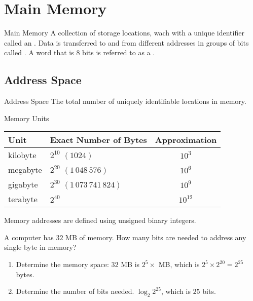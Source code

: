 \documentclass[\main/notes.tex]{subfiles}
\begin{document}
		\section{Main Memory}
			\begin{definition}{Main Memory}
				A collection of storage locations, wach with a unique identifier called an . Data is transferred to and from different addresses in groups of bits called . A word that is $8$ bits is referred to as a .
			\end{definition}
			\subsection{Address Space}
				\begin{definition}{Address Space}
					The total number of uniquely identifiable locations in memory.
				\end{definition}
				\begin{sidenote}{Memory Units}
					\begin{center}
						\begin{tabular}{llc}
							Unit & Exact Number of Bytes & Approximation\\
							\midrule
							kilobyte & $2^{10}$ $(1024)$ & $10^{3}$\\
							megabyte & $2^{20}$ $(1\,048\,576)$ & $10^{6}$\\
							gigabyte & $2^{30}$ $(1\,073\,741\,824)$ & $10^{9}$\\
							terabyte & $2^{40}$ & $10^{12}$
						\end{tabular}
					\end{center}
				\end{sidenote}
				Memory addresses are defined using unsigned binary integers.
				\begin{example}
					A computer has $32$ MB of memory. How many bits are needed to address any single byte in memory?
					\begin{enumerate}[nosep]
						\item Determine the memory space: $32$ MB is $2^{5} \times$ MB, which is $2^{5} \times 2^{20} = 2^{25}$ bytes.
						\item Determine the number of bits needed. $\log_{2}2^{25}$, which is $25$ bits.
					\end{enumerate}
				\end{example}
\end{document}
